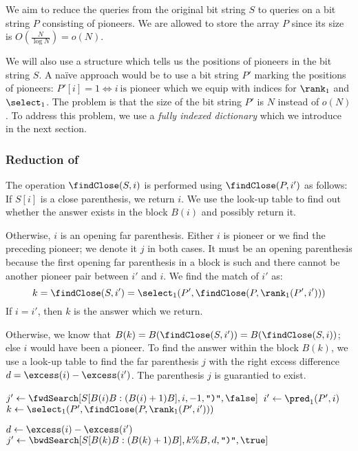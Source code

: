 \bigbreak

We aim to reduce the queries from the original bit string $S$ to queries on a bit string $P$ consisting of pioneers.
We are allowed to store the array $P$ since its size is $O(\frac{N}{\log N}) = o(N)$.

We will also use a structure which tells us the positions of pioneers in the bit string $S$.
A naïve approach would be to use a bit string $P'$ marking the positions of pioneers: $P'[i] = 1 \iff i\ \textrm{is pioneer}$ which we equip with indices for $\rank_1$ and $\select_1$.
The problem is that the size of the bit string $P'$ is $N$ instead of $o(N)$.
To address this problem, we use a \emph{fully indexed dictionary} which we introduce in the next section.

\subsubsection{Reduction of \findClose}

The operation $\findClose(S, i)$ is performed using $\findClose(P, i')$ as follows:
If $S[i]$ is a close parenthesis, we return $i$.
We use the look-up table to find out whether the answer exists in the block $B(i)$ and possibly return it.

Otherwise, $i$ is an opening far parenthesis.
Either $i$ is pioneer or we find the preceding pioneer; we denote it $j$ in both cases.
It must be an opening parenthesis because the first opening far parenthesis in a block is such and there cannot be another pioneer pair between $i'$ and $i$.
We find the match of $i'$ as:
$$ k = \findClose(S, i') = \select_1(P', \findClose(P, \rank_1(P', i'))) $$
If $i = i'$, then $k$ is the answer which we return.

Otherwise, we know that $B(k) = B(\findClose(S, i')) = B(\findClose(S, i))$; else $i$ would have been a pioneer.
To find the answer within the block $B(k)$, we use a look-up table \bwdSearch{} to find the far parenthesis $j$ with the right excess difference $d = \excess(i) - \excess(i')$.
The parenthesis $j$ is guarantied to exist.

\begin{algorithm}
\begin{algorithmic}
		\State {}
	\Else
		\State $j' \gets \fwdSearch[S[B(i)B: (B(i) + 1)B], i, -1, \closingParen, \false]$
			\State {} 
		\Else
			\State $i' \gets \pred_1(P', i)$
			\State $k \gets \select_1(P', \findClose(P, \rank_1(P', i')))$ 

			\State $d \gets \excess(i) - \excess(i')$
			\State $j' \gets \bwdSearch[S[B(k)B: (B(k) + 1)B], k \% B, d, \closingParen, \true]$
			\State {}
		\EndIf
	\EndIf
\EndFunction
\end{algorithmic}
\end{algorithm}

